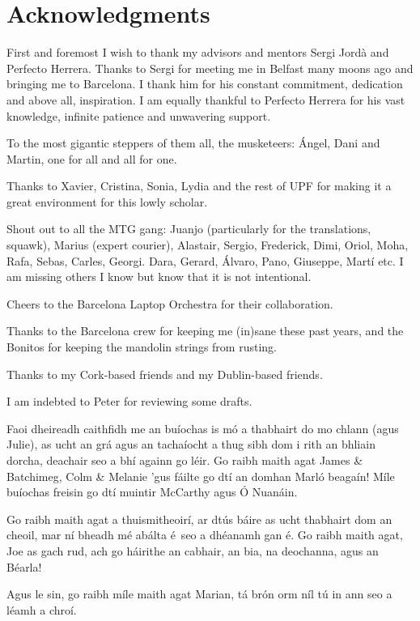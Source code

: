 \chapter*{Acknowledgments}

First and foremost I wish to thank my advisors and mentors Sergi Jordà and Perfecto Herrera. Thanks to Sergi for meeting me in Belfast many moons ago and bringing me to Barcelona. I thank him for his constant commitment, dedication and above all, inspiration. I am equally thankful to Perfecto Herrera for his vast knowledge, infinite patience and unwavering support. 

To the most gigantic steppers of them all, the musketeers: Ángel, Dani and Martin, one for all and all for one.

Thanks to Xavier, Cristina, Sonia, Lydia and the rest of UPF for making it a great environment for this lowly scholar.

Shout out to all the MTG gang: Juanjo (particularly for the translations, squawk), Marius (expert courier), Alastair, Sergio, Frederick, Dimi, Oriol, Moha, Rafa, Sebas, Carles, Georgi. Dara, Gerard, Álvaro, Pano, Giuseppe, Martí etc. I am missing others I know but know that it is not intentional. 

Cheers to the Barcelona Laptop Orchestra for their collaboration.

Thanks to the Barcelona crew for keeping me (in)sane these past years, and the Bonitos for keeping the mandolin strings from rusting.

Thanks to my Cork-based friends and my Dublin-based friends.

I am indebted to Peter for reviewing some drafts.

Faoi dheireadh caithfidh me an buíochas is mó a thabhairt do mo chlann (agus Julie), as ucht an grá agus an  tachaíocht a thug sibh dom i rith an bhliain dorcha, deachair seo a bhí againn go léir. Go raibh maith agat James \& Batchimeg, Colm \& Melanie 'gus fáilte go dtí an domhan Marló beagaín! Míle buíochas freisin go dtí muintir McCarthy agus Ó Nuanáin.

Go raibh maith agat a thuismitheoirí, ar dtús báire as ucht thabhairt dom an cheoil, mar ní bheadh mé abálta é seo a dhéanamh gan é. Go raibh maith agat, Joe as gach rud, ach go háirithe an cabhair, an bia, na deochanna, agus an Béarla!

Agus le sin, go raibh míle maith agat Marian, tá brón orm níl tú in ann seo a léamh a chroí.
%
%
\normalsize